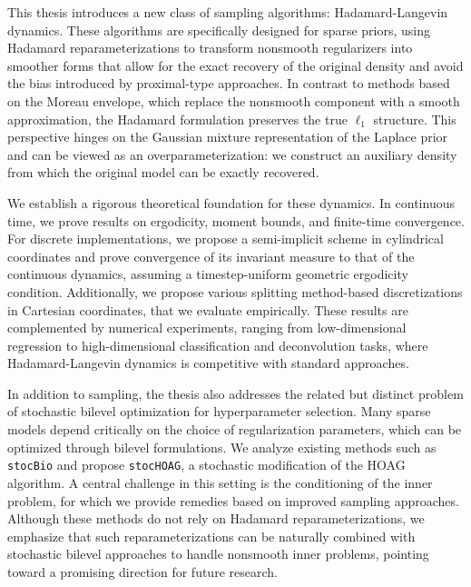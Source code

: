 \documentclass[11pt, twoside]{report}
\begin{document}
This thesis introduces a new class of sampling algorithms: Hadamard-Langevin dynamics. These algorithms are specifically designed for sparse priors, using Hadamard reparameterizations to transform nonsmooth regularizers into smoother forms that allow for the exact recovery of the original density and avoid the bias introduced by proximal-type approaches. In contrast to methods based on the Moreau envelope, which replace the nonsmooth component with a smooth approximation, the Hadamard formulation preserves the true $\ell_1$ structure. This perspective hinges on the Gaussian mixture representation of the Laplace prior and can be viewed as an overparameterization: we construct an auxiliary density from which the original model can be exactly recovered.

We establish a rigorous theoretical foundation for these dynamics. In continuous time, we prove results on ergodicity, moment bounds, and finite-time convergence. For discrete implementations, we propose a semi-implicit scheme in cylindrical coordinates and prove convergence of its invariant measure to that of the continuous dynamics, assuming a timestep-uniform geometric ergodicity condition. Additionally, we propose various splitting method-based discretizations in Cartesian coordinates, that we evaluate empirically. These results are complemented by numerical experiments, ranging from low-dimensional regression to high-dimensional classification and deconvolution tasks, where Hadamard-Langevin dynamics is competitive with standard approaches.

In addition to sampling, the thesis also addresses the related but distinct problem of stochastic bilevel optimization for hyperparameter selection. Many sparse models depend critically on the choice of regularization parameters, which can be optimized through bilevel formulations. We analyze existing methods such as \texttt{stocBio} and propose \texttt{stocHOAG}, a stochastic modification of the HOAG algorithm. A central challenge in this setting is the conditioning of the inner problem, for which we provide remedies based on improved sampling approaches. Although these methods do not rely on Hadamard reparameterizations, we emphasize that such reparameterizations can be naturally combined with stochastic bilevel approaches to handle nonsmooth inner problems, pointing toward a promising direction for future research.
\end{document}
